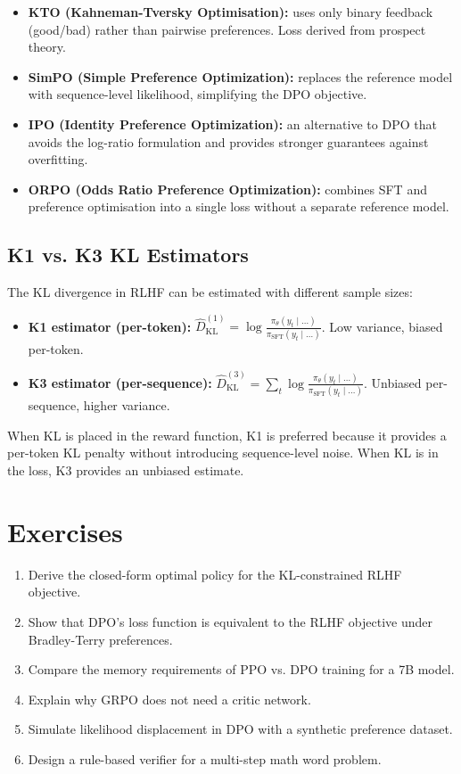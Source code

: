 \documentclass[11pt,a4paper]{book}
\theoremstyle{definition}
\begin{document}
\begin{itemize}
	\item \textbf{KTO (Kahneman-Tversky Optimisation):} uses only binary feedback (good/bad) rather than pairwise preferences. Loss derived from prospect theory.
	\item \textbf{SimPO (Simple Preference Optimization):} replaces the reference model with sequence-level likelihood, simplifying the DPO objective.
	\item \textbf{IPO (Identity Preference Optimization):} an alternative to DPO that avoids the log-ratio formulation and provides stronger guarantees against overfitting.
	\item \textbf{ORPO (Odds Ratio Preference Optimization):} combines SFT and preference optimisation into a single loss without a separate reference model.
\end{itemize}

\subsection{K1 vs. K3 KL Estimators}

The KL divergence in RLHF can be estimated with different sample sizes:
\begin{itemize}
	\item \textbf{K1 estimator (per-token):} $\hat{D}_{\mathrm{KL}}^{(1)} = \log \frac{\pi_\theta(y_t \mid \dots)}{\pi_{\text{SFT}}(y_t \mid \dots)}$. Low variance, biased per-token.
	\item \textbf{K3 estimator (per-sequence):} $\hat{D}_{\mathrm{KL}}^{(3)} = \sum_t \log \frac{\pi_\theta(y_t \mid \dots)}{\pi_{\text{SFT}}(y_t \mid \dots)}$. Unbiased per-sequence, higher variance.
\end{itemize}

When KL is placed in the reward function, K1 is preferred because it provides a per-token KL penalty without introducing sequence-level noise. When KL is in the loss, K3 provides an unbiased estimate.

\section{Exercises}

\begin{enumerate}
	\item Derive the closed-form optimal policy for the KL-constrained RLHF objective.
	\item Show that DPO's loss function is equivalent to the RLHF objective under Bradley-Terry preferences.
	\item Compare the memory requirements of PPO vs. DPO training for a 7B model.
	\item Explain why GRPO does not need a critic network.
	\item Simulate likelihood displacement in DPO with a synthetic preference dataset.
	\item Design a rule-based verifier for a multi-step math word problem.
\end{enumerate}
\end{document}
